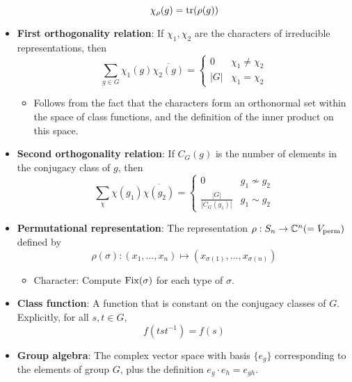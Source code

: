 \documentclass[../notes.tex]{subfiles}
\begin{document}
\begin{itemize}
    \begin{equation*}
        \chi_\rho(g) = \tr(\rho(g))
    \end{equation*}
    \item \textbf{First orthogonality relation}: If $\chi_1,\chi_2$ are the characters of irreducible representations, then
    \begin{equation*}
        \sum_{g\in G}\chi_1(g)\overline{\chi_2(g)} =
        \begin{cases}
            0 & \chi_1\neq\chi_2\\
            |G| & \chi_1=\chi_2
        \end{cases}
    \end{equation*}
    \begin{itemize}
        \item Follows from the fact that the characters form an orthonormal set within the space of class functions, and the definition of the inner product on this space.
    \end{itemize}
    \item \textbf{Second orthogonality relation}: If $C_G(g)$ is the number of elements in the conjugacy class of $g$, then
    \begin{equation*}
        \sum_\chi\chi(g_1)\overline{\chi(g_2)} =
        \begin{cases}
            0 & g_1\nsim g_2\\
            \frac{|G|}{|C_G(g_1)|} & g_1\sim g_2
        \end{cases}
    \end{equation*}
    \item \textbf{Permutational representation}: The representation $\rho:S_n\to\mathbb{C}^n(=V_\text{perm})$ defined by
    \begin{equation*}
        \rho(\sigma):(x_1,\dots,x_n)\mapsto(x_{\sigma(1)},\dots,x_{\sigma(n)})
    \end{equation*}
    \begin{itemize}
        \item Character: Compute $\operatorname{Fix}(\sigma)$ for each type of $\sigma$.
    \end{itemize}
    \item \textbf{Class function}: A function that is constant on the conjugacy classes of $G$. Explicitly, for all $s,t\in G$,
    \begin{equation*}
        f(tst^{-1}) = f(s)
    \end{equation*}
    \item \textbf{Group algebra}: The complex vector space with basis $\{e_g\}$ corresponding to the elements of group $G$, plus the definition $e_g\cdot e_h=e_{gh}$.

\end{itemize}
\end{document}
